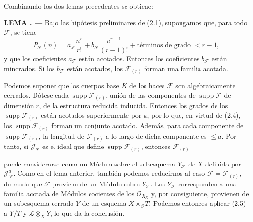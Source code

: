 \documentclass[11pt,twoside,openany]{book}
\numberwithin{equation}{section}
\newcommand{\src}[1]{%
  \phantomsection\hypertarget{src:#1}{}%
  \marginpar{\raggedleft\footnotesize\sffamily #1}%
}
\theoremstyle{plain}
\theoremstyle{definition}
\theoremstyle{remark}
\newcommand{\result}[2]{%
  \par\medskip\noindent\textbf{#1%
  \if\relax\detokenize{#2}\relax\else\space#2\fi. ---}\enspace
}
\newcommand{\FgaUnitKey}{frontmatter}
\renewcommand{\src}[1]{%
  \phantomsection\hypertarget{src:\FgaUnitKey:#1}{}%
  \marginpar{\raggedleft\footnotesize\sffamily #1}%
}
\theoremstyle{plain}
\theoremstyle{definition}
\theoremstyle{remark}
\begin{document}
Combinando los dos lemas precedentes se obtiene:

\result{LEMA}{2.6} Bajo las hipótesis preliminares de (2.1), supongamos que,
para todo $\mathcal F$, se tiene
\[
P_{\mathcal F}(n)=a_{\mathcal F}\frac{n^r}{r!}
+b_{\mathcal F}\frac{n^{r-1}}{(r-1)!}
+\text{términos de grado $<r-1$},
\]
y que los coeficientes $a_{\mathcal F}$ están acotados. Entonces los
coeficientes $b_{\mathcal F}$ están minorados. Si los $b_{\mathcal F}$ están
acotados, los $\mathcal F_{(r)}$ forman una familia acotada.

Podemos suponer que los cuerpos base $K$ de los haces $\mathcal F$ son
algebraicamente cerrados. Dótese cada
$\operatorname{supp}\mathcal F_{(r)}$, unión de las componentes de
$\operatorname{supp}\mathcal F$ de dimensión $r$, de la estructura reducida
inducida. Entonces los grados de los $\operatorname{supp}\mathcal F_{(r)}$
están acotados superiormente por $a$, por lo que, en virtud de (2.4), los
$\operatorname{supp}\mathcal F_{(r)}$ forman un conjunto acotado. Además, para
cada componente de $\operatorname{supp}\mathcal F_{(r)}$, la longitud de
$\mathcal F_{(r)}$ a lo largo de dicha componente es $\leq a$. Por tanto, si
$\mathcal J_{\mathcal F}$ es el ideal que define
$\operatorname{supp}\mathcal F_{(r)}$, entonces $\mathcal F_{(r)}$
\src{258}
puede considerarse como un Módulo sobre el subesquema $Y_{\mathcal F}$ de $X$
definido por $\mathcal J_{\mathcal F}^{a}$. Como en el lema anterior, también
podemos reducirnos al caso $\mathcal F=\mathcal F_{(r)}$, de modo que
$\mathcal F$ proviene de un Módulo sobre $Y_{\mathcal F}$. Los
$Y_{\mathcal F}$ corresponden a una familia acotada de Módulos cocientes de
los $\mathcal O_{X_K}$ y, por consiguiente, provienen de un subesquema cerrado
$Y$ de un esquema $X\times_S T$. Podemos entonces aplicar (2.5) a $Y/T$ y
$\mathcal L\otimes_XY$, lo que da la conclusión.
\end{document}

